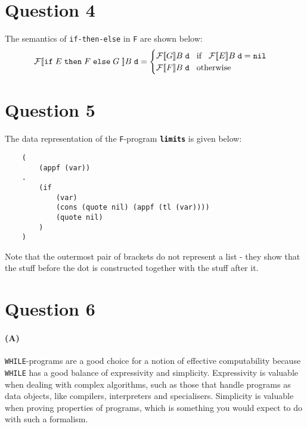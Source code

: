 \documentclass{article}
\begin{document}
\section*{Question 4}
The semantics of \texttt{if-then-else} in \texttt{F} are shown below:
\begin{equation*}
    \mathcal{F} [\![ \texttt{if} \hspace{1mm} E \hspace{1mm} \texttt{then} \hspace{1mm} F \hspace{1mm} \texttt{else} \hspace{1mm} G \hspace{1mm} ]\!] B \hspace{1mm} \texttt{d} = \begin{cases}
        \mathcal{F} [\![ G ]\!] B \hspace{1mm} \texttt{d} \hspace{3mm} \text{if} \hspace{3mm} \mathcal{F} [\![ E ]\!] B \hspace{1mm} \texttt{d} = \texttt{nil} \\
        \mathcal{F} [\![ F ]\!] B \hspace{1mm} \texttt{d} \hspace{3mm} \text{otherwise}
    \end{cases}
\end{equation*}

\section*{Question 5}
The data representation of the \texttt{F}-program \textbf{\texttt{limits}} is given below:
\begin{verbatim}
    (
        (appf (var))
    .
        (if
            (var)
            (cons (quote nil) (appf (tl (var))))
            (quote nil)
        )
    )
\end{verbatim}
Note that the outermost pair of brackets do not represent a list - they show that the stuff before the dot is constructed together with the stuff after it.

\section*{Question 6}
\paragraph*{(A)}
\texttt{WHILE}-programs are a good choice for a notion of effective computability because \texttt{WHILE} has a good balance of expressivity and simplicity. Expressivity is valuable when dealing with complex algorithms, such as those that handle programs as data objects, like compilers, interpreters and specialisers. Simplicity is valuable when proving properties of programs, which is something you would expect to do with such a formalism.
\end{document}

